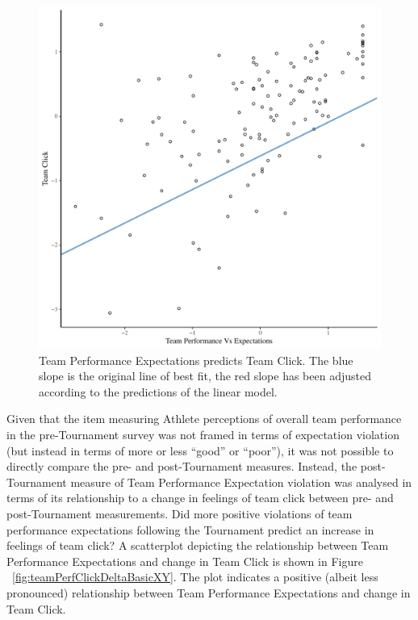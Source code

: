\begin{landscape}
  \begin{figure}[htbp]
  \includegraphics[width = \linewidth]{images/teamPerfClickModelSlope.pdf}
    \caption{Team Performance Expectations predicts Team Click. The blue slope is the original line of best fit, the red slope has been adjusted according to the predictions of the linear model.}
    \label{fig:teamPerfClickModelSlope}
  \end{figure}



Given that the item measuring Athlete perceptions of overall team performance in the pre-Tournament survey was not framed in terms of expectation violation (but instead in terms of more or less ``good'' or ``poor''), it was not possible to directly compare the pre- and post-Tournament measures.  Instead, the post-Tournament measure of Team Performance Expectation violation was analysed in terms of its relationship to a change in feelings of team click between pre- and post-Tournament measurements. Did more positive violations of team performance expectations following the Tournament predict an increase in feelings of team click? A scatterplot depicting the relationship between Team Performance Expectations and change in Team Click is shown in Figure ~\ref{fig:teamPerfClickDeltaBasicXY}. The plot indicates a positive (albeit less pronounced) relationship between Team Performance Expectations and change in Team Click.


\end{landscape}
